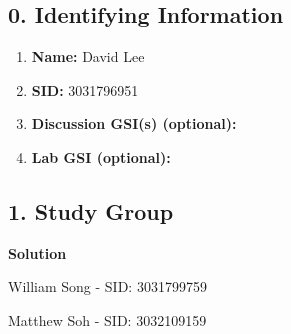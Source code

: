 \documentclass{article}\usepackage{amsmath,amssymb,amsthm,tikz,tkz-graph,color,chngpage,soul,hyperref,csquotes,graphicx,floatrow}\newcommand*{\QEDB}{\hfill\ensuremath{\square}}\newtheorem*{prop}{Proposition}\renewcommand{\theenumi}{\alph{enumi}}\usepackage[shortlabels]{enumitem}\usepackage[nobreak=true]{mdframed}\usetikzlibrary{matrix,calc}\MakeOuterQuote{"}\usepackage[margin=1in]{geometry} \newtheorem{theorem}{Theorem}
\begin{document}
\subsection*{0. Identifying Information}
\begin{enumerate}
\item \textbf{Name:} David Lee%
\item \textbf{SID:} 3031796951%
\item \textbf{Discussion GSI(s) (optional):} %
\item \textbf{Lab GSI (optional):} %
\end{enumerate}

\subsection*{1. Study Group}
\begin{mdframed}
\textbf{Solution}

William Song - SID: 3031799759

Matthew Soh - SID: 3032109159%
\end{mdframed}
\clearpage
\end{document}
